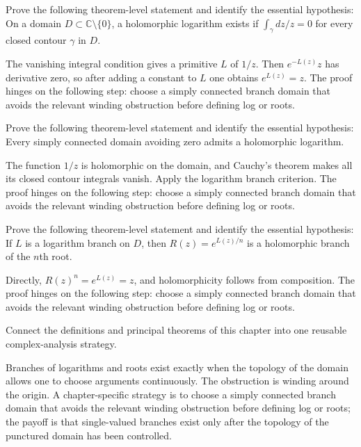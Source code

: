 \begin{problem}\label{prob:iv14-problem-09}
Prove the following theorem-level statement and identify the essential hypothesis: On a domain $D\subset\mathbb C\setminus\{0\}$, a holomorphic logarithm exists if $\int_\gamma dz/z=0$ for every closed contour $\gamma$ in $D$.
\end{problem}
\begin{solution}
The vanishing integral condition gives a primitive $L$ of $1/z$. Then $e^{-L(z)}z$ has derivative zero, so after adding a constant to $L$ one obtains $e^{L(z)}=z$. The proof hinges on the following step: choose a simply connected branch domain that avoids the relevant winding obstruction before defining log or roots.
\end{solution}

\begin{problem}\label{prob:iv14-problem-10}
Prove the following theorem-level statement and identify the essential hypothesis: Every simply connected domain avoiding zero admits a holomorphic logarithm.
\end{problem}
\begin{solution}
The function $1/z$ is holomorphic on the domain, and Cauchy's theorem makes all its closed contour integrals vanish. Apply the logarithm branch criterion. The proof hinges on the following step: choose a simply connected branch domain that avoids the relevant winding obstruction before defining log or roots.
\end{solution}

\begin{problem}\label{prob:iv14-problem-11}
Prove the following theorem-level statement and identify the essential hypothesis: If $L$ is a logarithm branch on $D$, then $R(z)=e^{L(z)/n}$ is a holomorphic branch of the $n$th root.
\end{problem}
\begin{solution}
Directly, $R(z)^n=e^{L(z)}=z$, and holomorphicity follows from composition. The proof hinges on the following step: choose a simply connected branch domain that avoids the relevant winding obstruction before defining log or roots.
\end{solution}

\begin{problem}\label{prob:iv14-problem-12}
Connect the definitions and principal theorems of this chapter into one reusable complex-analysis strategy.
\end{problem}
\begin{solution}
Branches of logarithms and roots exist exactly when the topology of the domain allows one to choose arguments continuously. The obstruction is winding around the origin. A chapter-specific strategy is to choose a simply connected branch domain that avoids the relevant winding obstruction before defining log or roots; the payoff is that single-valued branches exist only after the topology of the punctured domain has been controlled.
\end{solution}

